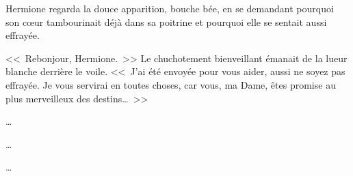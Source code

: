Hermione regarda la douce apparition, bouche bée, en se demandant pourquoi son cœur tambourinait déjà dans sa poitrine et pourquoi elle se sentait aussi effrayée.

<<~Rebonjour, Hermione.~>> Le chuchotement bienveillant émanait de la lueur blanche derrière le voile. <<~J'ai été envoyée pour vous aider, aussi ne soyez pas effrayée. Je vous servirai en toutes choses, car vous, ma Dame, êtes promise au plus merveilleux des destins…~>>

\begin{center}
…

…

…
\end{center}

